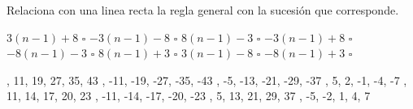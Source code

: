 Relaciona con una linea recta la regla general con la sucesión que corresponde.

\begin{multicols}{2}
    \begin{flushright}
        \begin{choices}
            \choice $3(n - 1) + 8 $ $\square$
            \choice $-3(n - 1) - 8$ $\square$
            \choice $8(n - 1) - 3 $ $\square$
            \choice $-3(n - 1) + 8$ $\square$
            \choice $-8(n - 1) - 3$ $\square$
            \choice $8(n - 1) + 3 $ $\square$
            \choice $3(n - 1) - 8 $ $\square$
            \choice $-8(n - 1) + 3$ $\square$
        \end{choices}
    \end{flushright}

    \vspace{1cm}
    \begin{checkboxes}
        , 11, 19, 27, 35, 43       \vspace{0.2cm}
        , -11, -19, -27, -35, -43 \vspace{0.2cm}
        , -5, -13, -21, -29, -37   \vspace{0.2cm}
        , 5, 2, -1, -4, -7         \vspace{0.2cm}
        , 11, 14, 17, 20, 23       \vspace{0.2cm}
        , -11, -14, -17, -20, -23 \vspace{0.2cm}
        , 5, 13, 21, 29, 37       \vspace{0.2cm}
        , -5, -2, 1, 4, 7         \vspace{0.2cm}
    \end{checkboxes}
\end{multicols}


